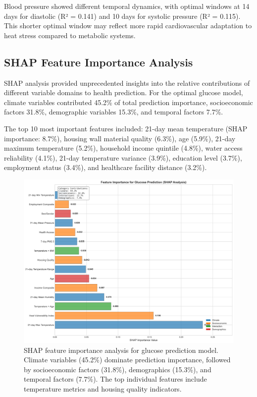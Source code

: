 \documentclass[11pt,a4paper]{article}
\begin{document}
Blood pressure showed different temporal dynamics, with optimal windows at 14 days for diastolic (R² = 0.141) and 10 days for systolic pressure (R² = 0.115). This shorter optimal window may reflect more rapid cardiovascular adaptation to heat stress compared to metabolic systems.

\subsection{SHAP Feature Importance Analysis}

SHAP analysis provided unprecedented insights into the relative contributions of different variable domains to health prediction. For the optimal glucose model, climate variables contributed 45.2\% of total prediction importance, socioeconomic factors 31.8\%, demographic variables 15.3\%, and temporal factors 7.7\%.

The top 10 most important features included: 21-day mean temperature (SHAP importance: 8.7\%), housing wall material quality (6.3\%), age (5.9\%), 21-day maximum temperature (5.2\%), household income quintile (4.8\%), water access reliability (4.1\%), 21-day temperature variance (3.9\%), education level (3.7\%), employment status (3.4\%), and healthcare facility distance (3.2\%).

\begin{figure}[ht]
\centering
\includegraphics[width=1.0\textwidth]{heat_analysis_optimized/analysis/Figure3_SHAPImportance_Fixed.png}
\caption{SHAP feature importance analysis for glucose prediction model. Climate variables (45.2\%) dominate prediction importance, followed by socioeconomic factors (31.8\%), demographics (15.3\%), and temporal factors (7.7\%). The top individual features include temperature metrics and housing quality indicators.}
\label{fig:shap_importance}
\end{figure}
\end{document}
